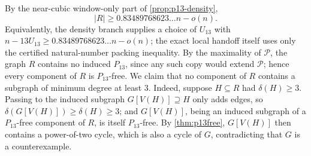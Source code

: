\documentclass[11pt]{article}
\begin{document}
By the near-cubic window-only part of \cref{prop:p13-density},
\[
|R|\ge0.83489768623\ldots n-o(n).
\]
Equivalently, the density branch supplies a choice of \(U_{13}\) with
\(n-13U_{13}\ge0.83489768623\ldots n-o(n)\); the exact local handoff itself
uses only the certified natural-number packing inequality.
By the maximality of $\mathcal P$, the graph $R$ contains no induced $P_{13}$, since any such copy would extend $\mathcal P$; hence every component of $R$ is $P_{13}$-free.  We claim that no component of $R$ contains a subgraph of minimum degree at least $3$.  Indeed, suppose $H\subseteq R$ had $\delta(H)\ge3$.  Passing to the induced subgraph $G[V(H)]\supseteq H$ only adds edges, so $\delta(G[V(H)])\ge\delta(H)\ge3$; and $G[V(H)]$, being an induced subgraph of a $P_{13}$-free component of $R$, is itself $P_{13}$-free.  By \cref{thm:p13free}, $G[V(H)]$ then contains a power-of-two cycle, which is also a cycle of $G$, contradicting that $G$ is a counterexample.
\end{document}
